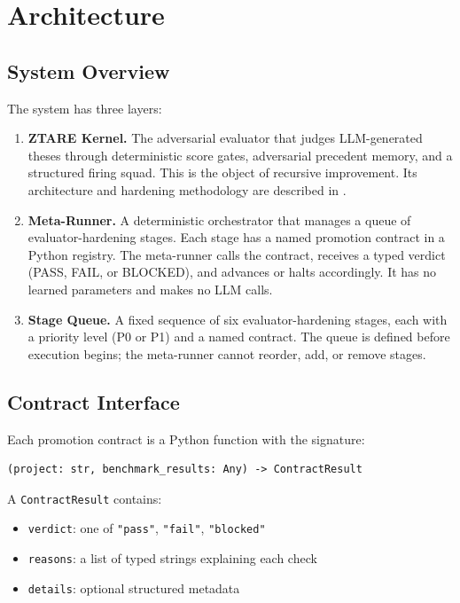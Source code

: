 \documentclass[11pt]{article}
\begin{document}
\section{Architecture}

\subsection{System Overview}

The system has three layers:

\begin{enumerate}[nosep]
\item \textbf{ZTARE Kernel.} The adversarial evaluator that judges LLM-generated theses through deterministic score gates, adversarial precedent memory, and a structured firing squad. This is the object of recursive improvement. Its architecture and hardening methodology are described in \citet{alami2025a, alami2025b}.

\item \textbf{Meta-Runner.} A deterministic orchestrator that manages a queue of evaluator-hardening stages. Each stage has a named promotion contract in a Python registry. The meta-runner calls the contract, receives a typed verdict (PASS, FAIL, or BLOCKED), and advances or halts accordingly. It has no learned parameters and makes no LLM calls.

\item \textbf{Stage Queue.} A fixed sequence of six evaluator-hardening stages, each with a priority level (P0 or P1) and a named contract. The queue is defined before execution begins; the meta-runner cannot reorder, add, or remove stages.
\end{enumerate}

\subsection{Contract Interface}

Each promotion contract is a Python function with the signature:

\begin{lstlisting}
(project: str, benchmark_results: Any) -> ContractResult
\end{lstlisting}

A \texttt{ContractResult} contains:
\begin{itemize}[nosep]
\item \texttt{verdict}: one of \texttt{"pass"}, \texttt{"fail"}, \texttt{"blocked"}
\item \texttt{reasons}: a list of typed strings explaining each check
\item \texttt{details}: optional structured metadata
\end{itemize}
\end{document}
